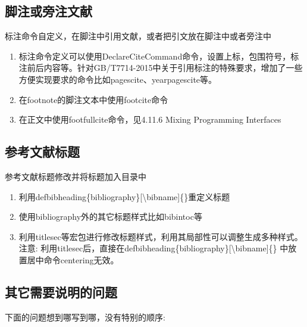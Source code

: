 \subsection{脚注或旁注文献}
  标注命令自定义，在脚注中引用文献，或者把引文放在脚注中或者旁注中
  \begin{enumerate}
    \item 标注命令定义可以使用DeclareCiteCommand命令，设置上标，包围符号，标注前后内容等。针对GB/T7714-2015中关于引用标注的特殊要求，增加了一些方便实现要求的命令比如pagescite、yearpagescite等。
    \item 在footnote的脚注文本中使用footcite命令
    \item 在正文中使用footfullcite命令，见4.11.6 Mixing Programming Interfaces
  \end{enumerate}

\subsection{参考文献标题}
  参考文献标题修改并将标题加入目录中
  \begin{enumerate}
    \item 利用defbibheading\{bibliography\}[\textbackslash bibname]\{\}重定义标题
    \item 使用bibliography外的其它标题样式比如bibintoc等
    \item 利用titlesec等宏包进行修改标题样式，利用其局部性可以调整生成多种样式。注意: 利用titlesec后，直接在defbibheading\{bibliography\}[\textbackslash bibname]\{\} 中放置居中命令centering无效。
  \end{enumerate}


\subsection{其它需要说明的问题}
下面的问题想到哪写到哪，没有特别的顺序:

